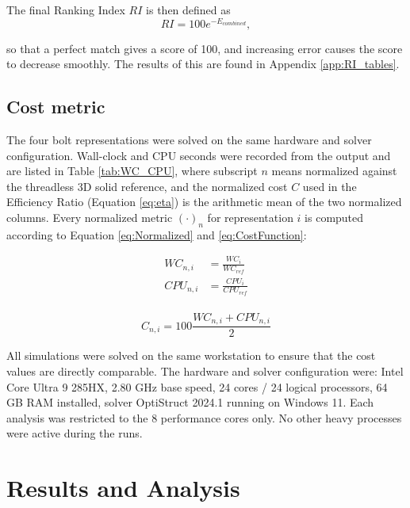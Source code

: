 \documentclass[a4paper,twoside]{bth}
\begin{document}
The final Ranking Index $RI$ is then defined as
\begin{equation} \label{eq:AccuracyMetric}
    RI = 100e^{-E_{combined}},
\end{equation}

so that a perfect match gives a score of 100, and increasing error causes the score to decrease smoothly. The results of this are found in Appendix \ref{app:RI_tables}.



\section{Cost metric} \label{sec:costMetric}
The four bolt representations were solved on the same hardware and solver configuration. Wall-clock and CPU seconds were recorded from the output and are listed in Table \ref{tab:WC_CPU}, where subscript $n$ means normalized against the threadless 3D solid reference, and the normalized cost $C$ used in the Efficiency Ratio (Equation \ref{eq:eta}) is the arithmetic mean of the two normalized columns. Every normalized metric $(\cdot)_n$ for representation $i$ is computed according to Equation \ref{eq:Normalized} and \ref{eq:CostFunction}:

\begin{equation} \label{eq:Normalized}
    \begin{aligned}
        WC_{n, i} &= \frac{WC_i}{WC_{ref}}\\
        CPU_{n, i} &= \frac{CPU_i}{CPU_{ref}}\\
    \end{aligned}
\end{equation}

\begin{equation} \label{eq:CostFunction}
    C_{n, i} = 100\frac{WC_{n, i}+CPU_{n, i}}{2}
\end{equation}

All simulations were solved on the same workstation to ensure that the cost values are directly comparable. The hardware and solver configuration were: Intel Core Ultra 9 285HX, 2.80 GHz base speed, 24 cores / 24 logical processors, 64 GB RAM installed, solver OptiStruct 2024.1 running on Windows 11. Each analysis was restricted to the 8 performance cores only. No other heavy processes were active during the runs.

\chapter{Results and Analysis}
\label{chp:results}
\end{document}
